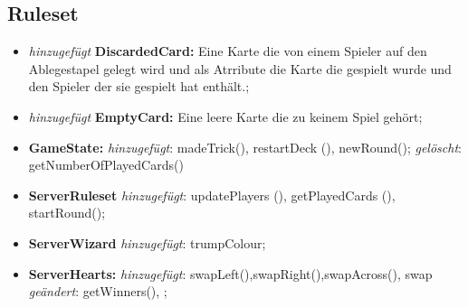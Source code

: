 \documentclass{article}
\begin{document}
\subsection{Ruleset}

\begin{itemize}
\item \textit{hinzugefügt} \textbf{DiscardedCard:} Eine Karte die von einem Spieler auf den Ablegestapel gelegt wird und als Atrribute die Karte die gespielt wurde und den Spieler der sie gespielt hat 
enthält.;

\item \textit{hinzugefügt} \textbf{EmptyCard:} Eine leere Karte die zu keinem Spiel gehört;

\item \textbf{GameState:} \textit{hinzugefügt}: madeTrick(), restartDeck (), newRound(); \textit{gelöscht}: getNumberOfPlayedCards()

\item \textbf{ServerRuleset} \textit{hinzugefügt}: updatePlayers (), getPlayedCards (), startRound(); 

\item \textbf{ServerWizard} \textit{hinzugefügt}: trumpColour; 

\item \textbf{ServerHearts:} \textit{hinzugefügt}: swapLeft(),swapRight(),swapAcross(), swap
\textit{geändert}: getWinners(),  ;
\end{itemize}
\end{document}

